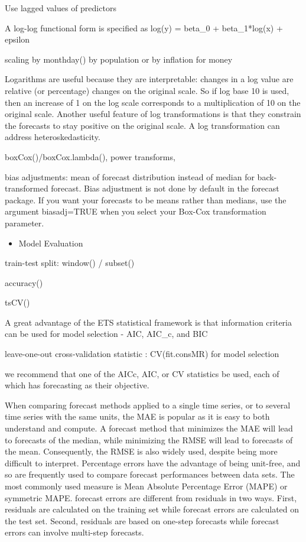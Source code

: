 \documentclass[]{book}
\providecommand{\tightlist}{%
  \setlength{\itemsep}{0pt}\setlength{\parskip}{0pt}}
\begin{document}
Use lagged values of predictors

A log-log functional form is specified as log(y) = beta\_0 +
beta\_1*log(x) + epsilon

scaling by monthday() by population or by inflation for money

Logarithms are useful because they are interpretable: changes in a log
value are relative (or percentage) changes on the original scale. So if
log base 10 is used, then an increase of 1 on the log scale corresponds
to a multiplication of 10 on the original scale. Another useful feature
of log transformations is that they constrain the forecasts to stay
positive on the original scale. A log transformation can address
heteroskedasticity.

boxCox()/boxCox.lambda(), power transforms,

bias adjustments: mean of forecast distribution instead of median for
back-transformed forecast. Bias adjustment is not done by default in the
forecast package. If you want your forecasts to be means rather than
medians, use the argument biasadj=TRUE when you select your Box-Cox
transformation parameter.

\begin{itemize}
\tightlist
\item
  Model Evaluation
\end{itemize}

train-test split: window() / subset()

accuracy()

tsCV()

A great advantage of the ETS statistical framework is that information
criteria can be used for model selection - AIC, AIC\_c, and BIC

leave-one-out cross-validation statistic : CV(fit.consMR) for model
selection

we recommend that one of the AICc, AIC, or CV statistics be used, each
of which has forecasting as their objective.

When comparing forecast methods applied to a single time series, or to
several time series with the same units, the MAE is popular as it is
easy to both understand and compute. A forecast method that minimizes
the MAE will lead to forecasts of the median, while minimizing the RMSE
will lead to forecasts of the mean. Consequently, the RMSE is also
widely used, despite being more difficult to interpret. Percentage
errors have the advantage of being unit-free, and so are frequently used
to compare forecast performances between data sets. The most commonly
used measure is Mean Absolute Percentage Error (MAPE) or symmetric MAPE.
forecast errors are different from residuals in two ways. First,
residuals are calculated on the training set while forecast errors are
calculated on the test set. Second, residuals are based on one-step
forecasts while forecast errors can involve multi-step forecasts.
\end{document}
